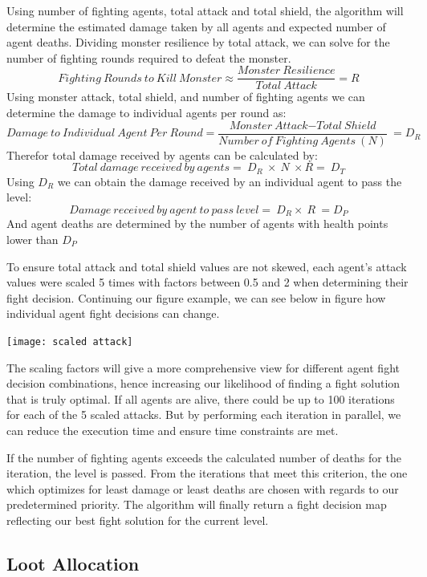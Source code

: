 \noindent Using number of fighting agents, total attack and total shield, the algorithm will determine the estimated damage taken by all agents and expected number of agent deaths. Dividing monster resilience by total attack, we can solve for the number of fighting rounds required to defeat the monster. 
\[Fighting\ Rounds\ to\ Kill\ Monster\approx \frac{Monster\ Resilience}{Total\ Attack}=R\] 
Using monster attack, total shield, and number of fighting agents we can determine the damage to individual agents per round as:
\[Damage\ to\ Individual\ Agent\ Per\ Round=\frac{Monster\ Attack\mathrm{-}Total\ Shield}{Number\ of\ Fighting\ Agents\ (N)}\ =D_R\] 
Therefor total damage received by agents can be calculated by:
\[Total\ damage\ received\ by\ agents=\ D_R\ \times \ N\ \times R=\ D_T\] 
Using $D_R$ we can obtain the damage received by an individual agent to pass the level:
\[Damage\ received\ by\ agent\ to\ pass\ level=\ D_R\times \ R\ =D_P\] 
And agent deaths are determined by the number of agents with health points lower than $D_P$

\noindent To ensure total attack and total shield values are not skewed, each agent's attack values were scaled 5 times with factors between 0.5 and 2 when determining their fight decision. Continuing our figure example, we can see below in figure how individual agent fight decisions can change.
\begin{center}
    \texttt{[image: scaled attack]}
\end{center}
\noindent The scaling factors will give a more comprehensive view for different agent fight decision combinations, hence increasing our likelihood of finding a fight solution that is truly optimal. If all agents are alive, there could be up to 100 iterations for each of the 5 scaled attacks. But by performing each iteration in parallel, we can reduce the execution time and ensure time constraints are met.

\noindent If the number of fighting agents exceeds the calculated number of deaths for the iteration, the level is passed. From the iterations that meet this criterion, the one which optimizes for least damage or least deaths are chosen with regards to our predetermined priority. The algorithm will finally return a fight decision map reflecting our best fight solution for the current level. 



\subsection{Loot Allocation}
